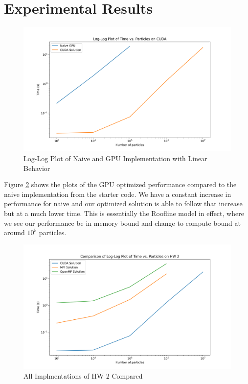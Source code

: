 \documentclass{article}
\begin{document}
\section{Experimental Results}

\begin{figure}[H]
	\centerline{\includegraphics[width=6in]{figures/log-log.png}}
	\caption{Log-Log Plot of Naive and GPU Implementation with Linear Behavior}
	\label{fig:log-log}
\end{figure}


Figure \ref{fig:compare} shows the plots of the GPU optimized performance compared to the naive implementation from the starter code. We have a constant increase in performance for naive and our optimized solution is able to follow that increase but at a much lower time. This is essentially the Roofline model in effect, where we see our performance be in memory bound and change to compute bound at around $10^5$ particles.

\begin{figure}[H]
	\centerline{\includegraphics[width=6in]{figures/hw2-compare.png}}
	\caption{All Implmentations of HW 2 Compared}
	\label{fig:compare}
\end{figure}
\end{document}

